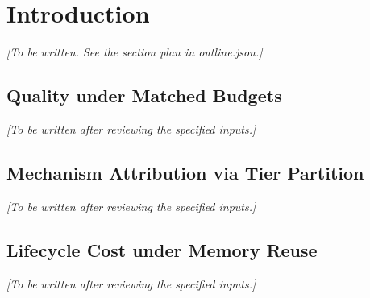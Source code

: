 \section{Introduction}
\label{sec:introduction}
\textit{[To be written. See the section plan in outline.json.]}
\subsection{Quality under Matched Budgets}
\label{sec:rq_quality}
\textit{[To be written after reviewing the specified inputs.]}
\subsection{Mechanism Attribution via Tier Partition}
\label{sec:rq_attribution}
\textit{[To be written after reviewing the specified inputs.]}
\subsection{Lifecycle Cost under Memory Reuse}
\label{sec:rq_lifecycle}
\textit{[To be written after reviewing the specified inputs.]}
